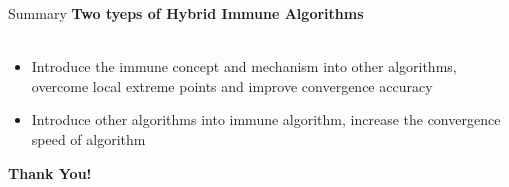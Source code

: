 \begin{frame}{Summary}
\textbf{Two tyeps of Hybrid Immune Algorithms} \\~\\
\begin{itemize}
\item{Introduce the immune concept and mechanism into other algorithms, overcome local extreme points and improve convergence accuracy}
\item{Introduce other algorithms into immune algorithm, increase the convergence speed of algorithm}
\end{itemize}
\end{frame}

\begin{frame}
\centering \Huge \textbf{Thank You!}
\end{frame}
